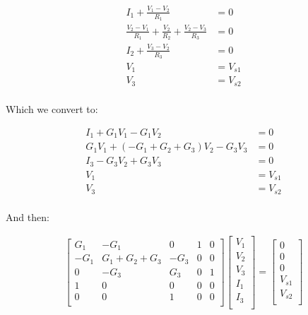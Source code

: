 \documentclass[12pt]{report}
\newcommand{\pr}[1]{\left(#1\right)}
\begin{document}
\begin{equation} \label{lattice5}
\begin{split}
I_1 + \frac{V_1 - V_2}{R_1} &= 0 \\
\frac{V_2 - V_1}{R_1} + \frac{V_2}{R_2} + \frac{V_2 - V_3}{R_3} &= 0 \\ 
I_2 + \frac{V_3 - V_2}{R_3} &= 0 \\
V_1 & = V_{s1} \\
V_3 & = V_{s2} \\
\end{split}
\end{equation}

Which we convert to: 

\begin{equation} \label{lattice6}
\begin{split}
I_1 + G_1V_1 - G_1V_2 &= 0 \\
G_1V_1 + \pr{-G_1 + G_2 + G_3}V_2 - G_3V_3 &= 0 \\ 
I_3 - G_3V_2 + G_3V_3 &= 0 \\
V_1 & = V_{s1} \\
V_3 & = V_{s2} \\
\end{split}
\end{equation}

And then: 

\begin{align}
\begin{bmatrix} 
G_1 &   -G_1 &  0   & 1     &   0    \\
-G_1 &   G_1 + G_2 + G_3 &  -G_3   & 0     &   0    \\
0 &   -G_3 &  G_3   & 0     &   1    \\
1 &   0 &  0   & 0     &   0    \\
0 &   0 &  1   & 0     &   0    \\
\end{bmatrix}
\begin{bmatrix} 
V_1      \\
V_2      \\
V_3      \\
I_1      \\
I_3      \\
\end{bmatrix}
= 
\begin{bmatrix} 
0     \\
0      \\
0     \\
V_{s1}      \\
V_{s2}     \\
\end{bmatrix}
\end{align}
\end{document}
